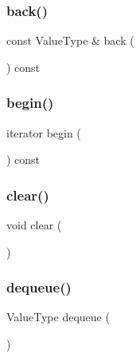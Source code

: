 \mbox{\label{classQueue_adc761c91bdacd01bed5c96e25fd9486a}} 
\subsubsection{\texorpdfstring{back()}{back()}}
{\footnotesize\ttfamily const Value\+Type \& back (\begin{DoxyParamCaption}{ }\end{DoxyParamCaption}) const}

\mbox{\label{classQueue_a0c62c15c8ed609e7e5e9518cf5f5c712}} 
\subsubsection{\texorpdfstring{begin()}{begin()}}
{\footnotesize\ttfamily iterator begin (\begin{DoxyParamCaption}{ }\end{DoxyParamCaption}) const\hspace{0.3cm}{\ttfamily [inline]}}

\mbox{\label{classQueue_ac8bb3912a3ce86b15842e79d0b421204}} 
\subsubsection{\texorpdfstring{clear()}{clear()}}
{\footnotesize\ttfamily void clear (\begin{DoxyParamCaption}{ }\end{DoxyParamCaption})}

\mbox{\label{classQueue_aaee07e371e2370e76e6c42bada727ba2}} 
\subsubsection{\texorpdfstring{dequeue()}{dequeue()}}
{\footnotesize\ttfamily Value\+Type dequeue (\begin{DoxyParamCaption}{ }\end{DoxyParamCaption})}

\mbox{\label{classQueue_a68b688a51bd0cf6fb5bc2cba292209a8}} 
